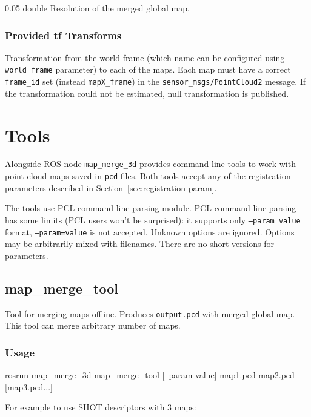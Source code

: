 {0.05}
{double}
{Resolution of the merged global map.}

\subsubsection{Provided tf Transforms}

{Transformation from the world frame (which name can be configured using \texttt{world\_frame} parameter) to each of the maps. Each map must have a correct \texttt{frame\_id} set (instead \texttt{mapX\_frame}) in the \texttt{sensor\_msgs/PointCloud2} message. If the transformation could not be estimated, null transformation is published.}

\section{Tools}

Alongside \gls{ROS} node \texttt{map\_merge\_3d} provides command-line tools to work with point cloud maps saved in \texttt{pcd} files. Both tools accept any of the registration parameters described in Section~\ref{sec:registration-param}.

The tools use \gls{PCL} command-line parsing module. \gls{PCL} command-line parsing has some limits (\gls{PCL} users won't be surprised): it supports only \texttt{--param value} format, \texttt{--param=value} is not accepted. Unknown options are ignored. Options may be arbitrarily mixed with filenames. There are no short versions for parameters.

\subsection{map\_merge\_tool}

Tool for merging maps offline. Produces \texttt{output.pcd} with merged global map. This tool can merge arbitrary number of maps.

\subsubsection{Usage}

\begin{code}
rosrun map_merge_3d map_merge_tool [--param value] map1.pcd
map2.pcd [map3.pcd...]
\end{code}

For example to use SHOT descriptors with 3 maps:

